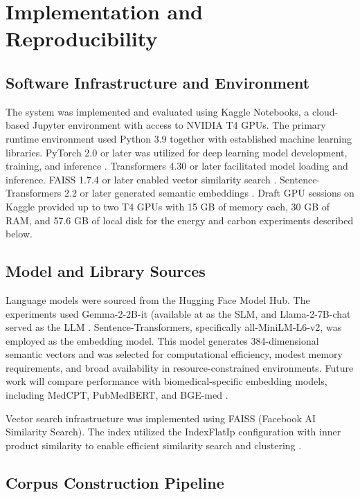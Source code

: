 \section{Implementation and Reproducibility}
\label{implementation-and-reproducibility}
 
\subsection{Software Infrastructure and Environment}
 
The system was implemented and evaluated using Kaggle Notebooks, a cloud-based Jupyter environment with access to NVIDIA T4 GPUs. The primary runtime environment used Python 3.9 together with established machine learning libraries. PyTorch 2.0 or later was utilized for deep learning model development, training, and inference \cite{paszke2019pytorch}. Transformers 4.30 or later facilitated model loading and inference. FAISS 1.7.4 or later enabled vector similarity search \cite{yang2025rag}. Sentence-Transformers 2.2 or later generated semantic embeddings \cite{gu2020pubmedbert}. Draft GPU sessions on Kaggle provided up to two T4 GPUs with 15 GB of memory each, 30 GB of RAM, and 57.6 GB of local disk for the energy and carbon experiments described below.
 
\subsection{Model and Library Sources}
 
Language models were sourced from the Hugging Face Model Hub. The experiments used Gemma-2-2B-it (available at as the SLM, and Llama-2-7B-chat served as the LLM \cite{amugongo2025retrieval}. Sentence-Transformers, specifically all-MiniLM-L6-v2, was employed as the embedding model. This model generates 384-dimensional semantic vectors and was selected for computational efficiency, modest memory requirements, and broad availability in resource-constrained environments. Future work will compare performance with biomedical-specific embedding models, including MedCPT, PubMedBERT, and BGE-med \cite{lee2020biobert, gu2020pubmedbert}.
 
Vector search infrastructure was implemented using FAISS (Facebook AI Similarity Search). The index utilized the IndexFlatIp configuration with inner product similarity to enable efficient similarity search and clustering \cite{yang2025rag, xiong2024rag}.
 
\subsection{Corpus Construction Pipeline}
 
